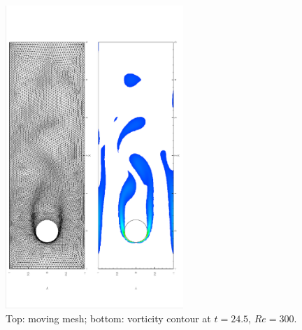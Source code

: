 \documentclass[mathpazo]{aamm}
\begin{document}
      \begin{figure}[!htbp]
       \begin{center}
         \includegraphics[width = 0.6\textwidth, angle = -90]{picture/obstacle_flow_data/mesh_t_24_5s.eps}
       \end{center}  
       \caption{\small Top: moving mesh; bottom: vorticity contour at
         $t = 24.5$, $Re = 300$.}
       \label{fig::cylinder_mesh_t24_5s}
     \end{figure}
\end{document}
